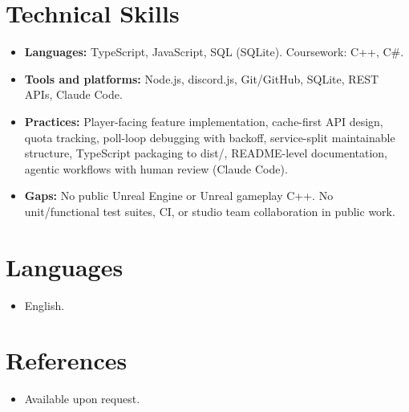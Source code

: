 \documentclass[11pt,a4paper,sans]{moderncv}
\begin{document}
\section{Technical Skills}
\vspace{1pt}
\begin{itemize}
\item \textbf{Languages:} TypeScript, JavaScript, SQL (SQLite). Coursework: C++, C\#.
\item \textbf{Tools and platforms:} Node.js, discord.js, Git/GitHub, SQLite, REST APIs, Claude Code.
\item \textbf{Practices:} Player-facing feature implementation, cache-first API design, quota tracking, poll-loop debugging with backoff, service-split maintainable structure, TypeScript packaging to dist/, README-level documentation, agentic workflows with human review (Claude Code).
\item \textbf{Gaps:} No public Unreal Engine or Unreal gameplay C++. No unit/functional test suites, CI, or studio team collaboration in public work.
\end{itemize}


\section{Languages}
\vspace{1pt}
\begin{itemize}
\item English.
\end{itemize}


\section{References}
\vspace{1pt}
\begin{itemize}
\item{Available upon request.}
\end{itemize}
\end{document}
